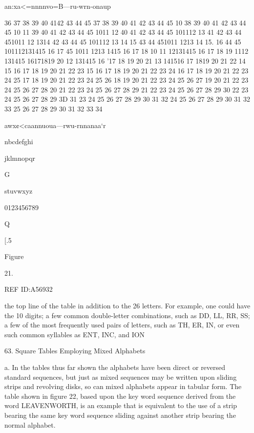 {{{an:xa<=nnnnvo=B—ru-wrn-onaup

36 37 38 39 40 4142 43 44 45
37 38 39 40 41 42 43 44 45 10
38 39 40 41 42 43 44 45 10 11
39 40 41 42 43 44 45 1011 12
40 41 42 43 44 45 101112 13
41 42 43 44 451011 12 1314
42 43 44 45 101112 13 14 15
43 44 451011 1213 14 15. 16
44 45 101112131415 16 17
45 1011 1213 1415 16 17 18
10 11 12131415 16 17 18 19
1112 131415 16171819 20
12 131415 16 '17 18 19 20 21
13 141516 17 1819 20 21 22
14 15 16 17 18 19 20 21 22 23
15 16 17 18 19 20 21 22 23 24
16 17 18 19 20 21 22 23 24 25
17 18 19 20 21 22 23 24 25 26
18 19 20 21 22 23 24 25 26 27
19 20 21 22 23 24 25 26 27 28
20 21 22 23 24 25 26 27 28 29
21 22 23 24 25 26 27 28 29 30
22 23 24 25 26 27 28 29 3D 31
23 24 25 26 27 28 29 30 31 32
24 25 26 27 28 29 30 31 32 33
25 26 27 28 29 30 31 32 33 34

awx¢<caannuoua—rwu-rnnanaa‘r

 

 

 

nbcdefghi

 

 

jklmnopqr

 

G

 

 

stuvwxyz

 

0123456789

 

Q

 

 

[.5

Figure

21.

 

 

 

REF ID:A56932

the top line of the table in addition to the 26 letters. For example, one
could have the 10 digits; a few common double-letter combinations, such
as DD, LL, RR, SS; a few of the most frequently used pairs of letters,
such as TH, ER, IN, or even such common syllables as ENT, INC, and
ION

63. Square Tables Employing Mixed Alphabets

a. In the tables thus far shown the alphabets have been direct or
reversed standard sequences, but just as mixed sequences may be written
upon sliding strips and revolving disks, so can mixed alphabets appear in
tabular form. The table shown in ﬁgure 22, based upon the key word
sequence derived from the word LEAVENWORTH, is an example that
is equivalent to the use of a strip bearing the same key word sequence
sliding against another strip bearing the normal alphabet.

}}}
